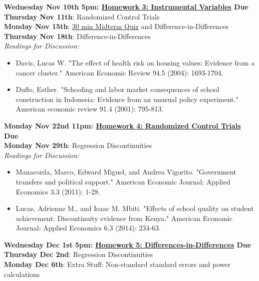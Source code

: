 \documentclass[a4paper, 10pt]{article}
\begin{document}
\noindent\textbf{Wednesday Nov 10th 5pm: \underline{Homework 3: Instrumental Variables} Due}\\

\noindent\textbf{Thursday Nov 11th}: Randomized Control Trials\\

\noindent\textbf{Monday Nov 15th}: \underline{30 min Midterm Quiz} and  Difference-in-Differences\\


\noindent\textbf{Thursday Nov 18th}:  Difference-in-Differences\\
\textit{Readings for Discussion:}
\begin{itemize}
\item Davis, Lucas W. "The effect of health risk on housing values: Evidence from a cancer cluster." American Economic Review 94.5 (2004): 1693-1704. 
\item Duflo, Esther. "Schooling and labor market consequences of school construction in Indonesia: Evidence from an unusual policy experiment." American economic review 91.4 (2001): 795-813.
\end{itemize}


\noindent\textbf{Monday Nov 22nd 11pm: \underline{Homework 4: Randomized Control Trials}  Due}\\



\noindent\textbf{Monday Nov 29th}: Regression Discontinuities\\
\noindent\textit{Readings for Discussion:}
\begin{itemize}
\item Manacorda, Marco, Edward Miguel, and Andrea Vigorito. "Government transfers and political support." American Economic Journal: Applied Economics 3.3 (2011): 1-28.
\item Lucas, Adrienne M., and Isaac M. Mbiti. "Effects of school quality on student achievement: Discontinuity evidence from Kenya." American Economic Journal: Applied Economics 6.3 (2014): 234-63.
\end{itemize}

\noindent\textbf{Wednesday Dec 1st 5pm: \underline{Homework 5: Differences-in-Differences} Due}\\

\noindent\textbf{Thursday Dec 2nd}: Regression Discontinuities\\

\noindent\noindent\textbf{Monday Dec 6th}: Extra Stuff: Non-standard standard errors and power calculations\\
\end{document}
